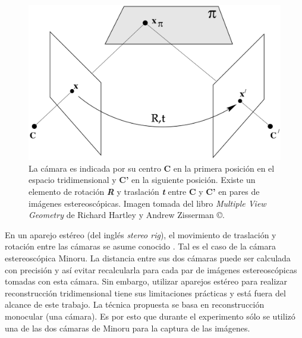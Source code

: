 \begin{figure}[H]
\centering
\includegraphics[width=1.0\textwidth]{images/camera-rt1.png}
\caption[Movimiento de c\'{a}mara entre pares de im\'{a}genes estereosc\'{o}picas]%
{La c\'{a}mara es indicada por su centro \textbf{C} en la primera posici\'{o}n en el espacio tridimensional y \textbf{C'} en la siguiente posici\'{o}n. Existe un elemento de rotaci\'{o}n \textbf{\textit{R}} y traslaci\'{o}n \textbf{\textit{t}} entre \textbf{C} y \textbf{C'} en pares de im\'{a}genes estereosc\'{o}picas. Imagen tomada del libro \textit{Multiple View Geometry} de Richard Hartley y Andrew Zisserman \copyright \cite{Hartley_Zisserman_2003}.}
\label{fig:CameraMotion1}
\end{figure}


En un aparejo est\'{e}reo (del ingl\'{e}s \textit{stereo rig}), el movimiento de traslaci\'{o}n y rotaci\'{o}n entre las c\'{a}maras se asume conocido \cite{Faugeras_Toscani_1986,Hartley_Zisserman_2003}. Tal es el caso de la c\'{a}mara estereosc\'{o}pica Minoru. La distancia entre sus dos c\'{a}maras puede ser calculada con precisi\'{o}n y as\'{i} evitar recalcularla para cada par de im\'{a}genes estereosc\'{o}picas tomadas con esta c\'{a}mara. Sin embargo, utilizar aparejos est\'{e}reo para realizar reconstrucci\'{o}n tridimensional tiene sus limitaciones pr\'{a}cticas y est\'{a} fuera del alcance de este trabajo. La t\'{e}cnica propuesta se basa en reconstrucci\'{o}n monocular (una c\'{a}mara). Es por esto que durante el experimento s\'{o}lo se utiliz\'{o} una de las dos c\'{a}maras de Minoru para la captura de las im\'{a}genes.

